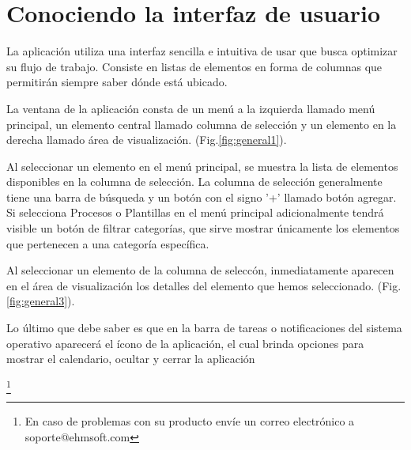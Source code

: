 

\section{Conociendo la interfaz de usuario}
La aplicaci\'on utiliza una interfaz sencilla e intuitiva de usar que busca optimizar su flujo de trabajo. Consiste en listas de elementos en forma de columnas que permitir\'an siempre saber d\'onde est\'a ubicado.

La ventana de la aplicaci\'on consta de un men\'u a la izquierda llamado men\'u principal, un elemento central llamado columna de selecci\'on y un elemento en la derecha llamado \'area de visualizaci\'on. (Fig.\ref{fig:general1}). 


Al seleccionar un elemento en el men\'u principal, se muestra la lista de elementos disponibles en la columna de selecci\'on. La columna de selecci\'on generalmente tiene una barra de b\'usqueda y un bot\'on con el signo '+' llamado bot\'on agregar. Si selecciona Procesos o Plantillas en el men\'u principal adicionalmente tendr\'a visible un bot\'on de filtrar categor\'ias, que sirve mostrar \'unicamente los elementos que pertenecen a una categor\'ia espec\'ifica.

Al seleccionar un elemento de la columna de selecc\'on, inmediatamente aparecen en el \'area de visualizaci\'on los detalles del elemento que hemos seleccionado. (Fig.\ref{fig:general3}). 

Lo \'ultimo que debe saber es que en la barra de tareas o notificaciones del sistema operativo aparecer\'a el \'icono de la aplicaci\'on, el cual brinda opciones para mostrar el calendario, ocultar y cerrar la aplicaci\'on

\footnote{En caso de problemas con su producto env\'ie un correo
electr\'onico a \mbox{soporte@ehmsoft.com}}

